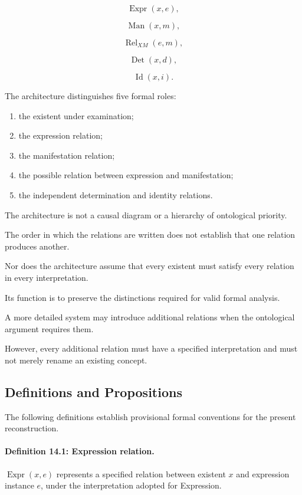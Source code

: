 \[
    \operatorname{Expr}(x,e),
\]

\[
    \operatorname{Man}(x,m),
\]

\[
    \operatorname{Rel}_{XM}(e,m),
\]

\[
    \operatorname{Det}(x,d),
\]

\[
    \operatorname{Id}(x,i).
\]

The architecture distinguishes
five formal roles:

\begin{enumerate}
    \item the existent under
    examination;
    \item the expression relation;
    \item the manifestation relation;
    \item the possible relation
    between expression and
    manifestation;
    \item the independent
    determination and identity
    relations.
\end{enumerate}

The architecture is not
a causal diagram or a
hierarchy of ontological
priority.

The order in which the
relations are written
does not establish that
one relation produces
another.

Nor does the architecture
assume that every existent
must satisfy every relation
in every interpretation.

Its function is to preserve
the distinctions required
for valid formal analysis.

A more detailed system
may introduce additional
relations when the
ontological argument
requires them.

However, every additional
relation must have a
specified interpretation
and must not merely
rename an existing concept.

\subsection{Definitions and Propositions}

The following definitions
establish provisional
formal conventions for
the present reconstruction.

\paragraph{Definition 14.1: Expression relation.}

\(\operatorname{Expr}(x,e)\)
represents a specified
relation between existent
\(x\) and expression instance
\(e\), under the interpretation
adopted for Expression.

